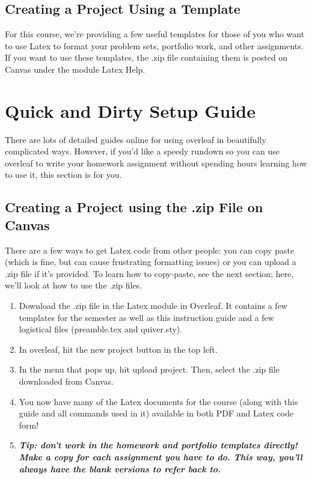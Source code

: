 \documentclass[11 pt]{article}
\begin{document}
\subsection{Creating a Project Using a Template}
For this course, we're providing a few useful templates for those of you who want to use Latex to format your problem sets, portfolio work, and other assignments. If you want to use these templates, the .zip file containing them is posted on Canvas under the module Latex Help. 

\color{black}



\section{Quick and Dirty Setup Guide}

There are lots of detailed guides online for using overleaf in beautifully complicated ways. However, if you'd like a speedy rundown so you can use overleaf to write your homework assignment without spending hours learning how to use it, this section is for you.

\subsection{Creating a Project using the .zip File on Canvas}

There are a few ways to get Latex code from other people: you can copy paste (which is fine, but can cause frustrating formatting issues) or you can upload a .zip file if it's provided. To learn how to copy-paste, see the next section; here, we'll look at how to use the .zip files.

\begin{enumerate}
    \item Download the .zip file in the Latex module in Overleaf. It contains a few templates for the semester as well as this instruction guide and a few logistical files (preamble.tex and quiver.sty).
    \item In overleaf, hit the new project button in the top left.
    \item In the menu that pops up, hit upload project. Then, select the .zip file downloaded from Canvas.
    \item You now have many of the Latex documents for the course (along with this guide and all commands used in it) available in both PDF and Latex code form!
    \item \textit{\textbf{Tip: don't work in the homework and portfolio templates directly! Make a copy for each assignment you have to do. This way, you'll always have the blank versions to refer back to.}}%
\end{enumerate}
\end{document}
